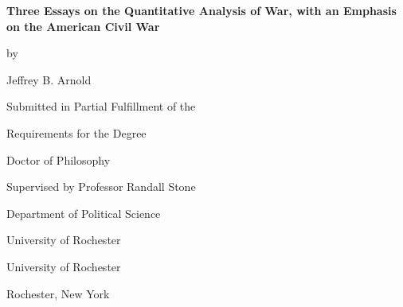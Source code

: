 

\begin{titlepage}
  \vspace*{\fill}

  \begin{center}
    {\LARGE \bfseries
      Three Essays on the Quantitative Analysis of War,
      with an Emphasis on the American Civil War
      \par
    }

    \bigskip%
    by

    \bigskip%
    Jeffrey B. Arnold


    \bigskip\bigskip\bigskip\bigskip%
    Submitted in Partial Fulfillment of the

    \bigskip%
    Requirements for the Degree

    \bigskip%
    Doctor of Philosophy


    \bigskip\bigskip\bigskip\bigskip%
    Supervised by Professor Randall Stone

    \bigskip\bigskip%
    Department of Political Science

    \bigskip%
    University of Rochester


    \bigskip\bigskip\bigskip\bigskip%
    University of Rochester

    \bigskip%
    Rochester, New York


    \bigskip\bigskip\bigskip{}
  \end{center}

  \vspace*{\fill}
\end{titlepage}

